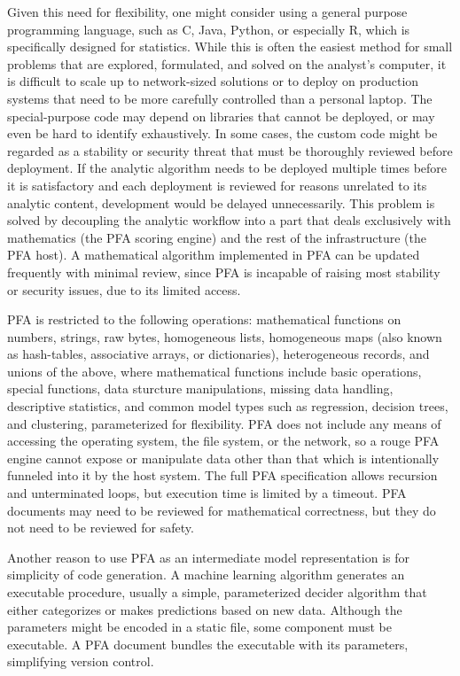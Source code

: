 \documentclass{article}
\begin{document}
Given this need for flexibility, one might consider using a general purpose programming language, such as C, Java, Python, or especially R, which is specifically designed for statistics.  While this is often the easiest method for small problems that are explored, formulated, and solved on the analyst's computer, it is difficult to scale up to network-sized solutions or to deploy on production systems that need to be more carefully controlled than a personal laptop.  The special-purpose code may depend on libraries that cannot be deployed, or may even be hard to identify exhaustively.  In some cases, the custom code might be regarded as a stability or security threat that must be thoroughly reviewed before deployment.  If the analytic algorithm needs to be deployed multiple times before it is satisfactory and each deployment is reviewed for reasons unrelated to its analytic content, development would be delayed unnecessarily.  This problem is solved by decoupling the analytic workflow into a part that deals exclusively with mathematics (the PFA scoring engine) and the rest of the infrastructure (the PFA host).  A mathematical algorithm implemented in PFA can be updated frequently with minimal review, since PFA is incapable of raising most stability or security issues, due to its limited access.

PFA is restricted to the following operations: mathematical functions on numbers, strings, raw bytes, homogeneous lists, homogeneous maps (also known as hash-tables, associative arrays, or dictionaries), heterogeneous records, and unions of the above, where mathematical functions include basic operations, special functions, data sturcture manipulations, missing data handling, descriptive statistics, and common model types such as regression, decision trees, and clustering, parameterized for flexibility.  PFA does not include any means of accessing the operating system, the file system, or the network, so a rouge PFA engine cannot expose or manipulate data other than that which is intentionally funneled into it by the host system.  The full PFA specification allows recursion and unterminated loops, but execution time is limited by a timeout.  PFA documents may need to be reviewed for mathematical correctness, but they do not need to be reviewed for safety.

Another reason to use PFA as an intermediate model representation is for simplicity of code generation.  A machine learning algorithm generates an executable procedure, usually a simple, parameterized decider algorithm that either categorizes or makes predictions based on new data.  Although the parameters might be encoded in a static file, some component must be executable.  A PFA document bundles the executable with its parameters, simplifying version control.
\end{document}
